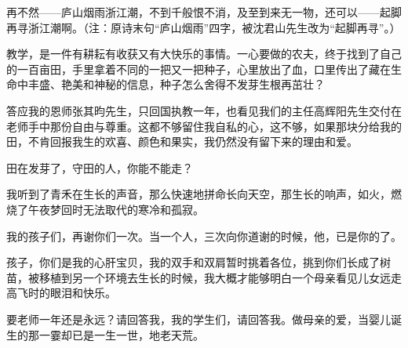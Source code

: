 \par 再不然——庐山烟雨浙江潮，不到千般恨不消，及至到来无一物，还可以——起脚再寻浙江潮啊。（注：原诗末句“庐山烟雨”四字，被沈君山先生改为“起脚再寻”。）
\par 教学，是一件有耕耘有收获又有大快乐的事情。一心要做的农夫，终于找到了自己的一百亩田，手里拿着不同的一把又一把种子，心里放出了血，口里传出了藏在生命中丰盛、艳美和神秘的信息，种子怎么舍得不发芽生根再茁壮？
\par 答应我的恩师张其昀先生，只回国执教一年，也看见我们的主任高辉阳先生交付在老师手中那份自由与尊重。这都不够留住我自私的心，这不够，如果那块分给我的田，不肯回报我生的欢喜、颜色和果实，我仍然没有留下来的理由和爱。
\par 田在发芽了，守田的人，你能不能走？
\par 我听到了青禾在生长的声音，那么快速地拼命长向天空，那生长的响声，如火，燃烧了午夜梦回时无法取代的寒冷和孤寂。
\par 我的孩子们，再谢你们一次。当一个人，三次向你道谢的时候，他，已是你的了。
\par 孩子，你们是我的心肝宝贝，我的双手和双肩暂时挑着各位，挑到你们长成了树苗，被移植到另一个环境去生长的时候，我大概才能够明白一个母亲看见儿女远走高飞时的眼泪和快乐。
\par 要老师一年还是永远？请回答我，我的学生们，请回答我。做母亲的爱，当婴儿诞生的那一霎却已是一生一世，地老天荒。
